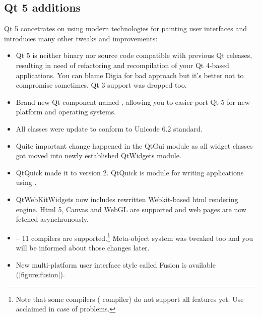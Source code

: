 \subsection{Qt 5 additions}
Qt 5 concetrates on using modern technologies for painting user interfaces and introduces many other tweaks and improvements:
\begin{itemize}
\item
Qt 5 is neither binary nor source code compatible with previous Qt releases, resulting in need of refactoring and recompilation of your Qt 4-based applications. You can blame Digia for bad approach but it's better not to compromise sometimes. Qt 3 support was dropped too.


\item
Brand new Qt component named , allowing you to easier port Qt 5 for new platform and operating systems.

\item
All classes were update to conform to Unicode 6.2 standard.

\item
Quite important change happened in the QtGui module as all widget classes got moved into newly established QtWidgets module.

\item
QtQuick made it to version 2. QtQuick is module for writing applications using .

\item
QtWebKitWidgets now includes rewritten Webkit-based html rendering engine. Html 5, Canvas and WebGL are supported and web pages are now fetched asynchronously.


\item
{} -- 11 compilers are supported.\footnote{Note that some compilers (\eg {} compiler) do not support all  features yet. Use acclaimed  in case of problems.} Meta-object system was tweaked too and you will be informed about those changes later.

\item
New multi-platform user interface style called Fusion is available (\autoref{figure:fusion}).
\end{itemize}

